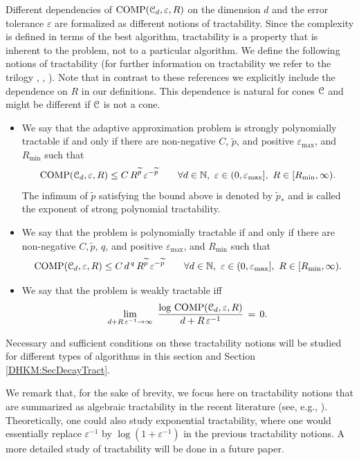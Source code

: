 \documentclass[USenglish]{article}
\theoremstyle{dgthm}
\theoremstyle{dgthm}
\theoremstyle{dgthm}
\theoremstyle{dgthm}
\theoremstyle{dgdef}
\theoremstyle{definition}
\DeclareMathOperator{\COMP}{COMP}
\begin{document}
Different dependencies of $\COMP(\calC_d, \varepsilon,R)$ on the dimension $d$ and the error tolerance $\varepsilon$ are formalized as different notions of tractability. Since 
the complexity is defined in terms of the best algorithm, tractability is a property that is inherent to the problem, not to a particular algorithm. 
We define the following notions of tractability (for further information on tractability we refer to the trilogy 
\cite{NovWoz08a}, \cite{NovWoz10a}, \cite{NovWoz12a}). Note that in contrast to 
these references we explicitly include the dependence on $R$ in our definitions. This 
dependence is natural for cones ${\mathcal{C}}$ and might be different if ${\mathcal{C}}$ is not a cone. 

\begin{itemize}   
\item We say that the adaptive approximation problem is strongly polynomially tractable
if and only if there are non-negative $C$, $\widetilde{p}$, and positive $\varepsilon_{\max}$, and $R_{\min}$ such that   
$$   
\COMP(\calC_d, \varepsilon,R)\le C\,R^{\widetilde{p}}\,\varepsilon^{-\widetilde{p}} \qquad \forall d\in\NN,\ \varepsilon \in (0, \varepsilon_{\max}], \ R \in [R_{\min}, \infty).
$$   
The infimum of $\widetilde{p}$ satisfying the bound above is denoted by $\widetilde{p}_*$  and is called the exponent of strong polynomial tractability.    
\newline \qquad   

\item    
We say that the problem is polynomially tractable
if and only if there are non-negative $C,\widetilde{p}$, $q$, and positive $\varepsilon_{\max}$, and $R_{\min}$ such that   
$$   
\COMP(\calC_d, \varepsilon,R)\le C\,d^{\,q}\,R^{\widetilde{p}}\,   
\varepsilon^{-{\widetilde{p}}}\qquad \forall d\in\NN,\ \varepsilon \in (0, \varepsilon_{\max}], \ R \in [R_{\min}, \infty).  
$$   
\vskip 0.5pc     

   
\item   
We say that the problem is weakly tractable iff    
$$   
\lim_{d+R\,\varepsilon^{-1}\to\infty}\   
\frac{\log\, \COMP(\calC_d, \varepsilon,R)}   
{d+R\,\varepsilon^{-1}}\,=\,0.   
$$    
\end{itemize}   
Necessary and sufficient conditions on these tractability notions will be studied 
for different types of algorithms in this section and Section \ref{DHKM:SecDecayTract}. 

We remark that, for the sake of brevity, we focus here on tractability notions that are summarized as 
algebraic tractability in the recent literature 
(see, e.g., \cite{KriWoz19}). Theoretically, one could also study exponential tractability, where 
one would essentially replace $\varepsilon^{-1}$ 
by $\log (1 + \varepsilon^{-1})$ in the previous tractability notions. A more detailed study of 
tractability will be done in a future paper.
\end{document}
